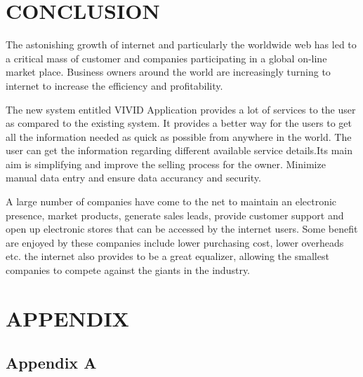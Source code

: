 \documentclass[a4paper,12pt]{article}
\begin{document}
\newpage
\section{CONCLUSION}\vspace{5mm}
  The astonishing growth of internet and particularly the worldwide web has led to a critical mass of customer and companies participating in a global on-line market place. Business owners around the world are increasingly turning to internet to increase the efficiency and profitability.
\par\vspace{2mm}
 The new system entitled VIVID Application provides a lot of services to the user as compared to the existing system. It provides a better way for the users to get all the information needed as quick as possible from anywhere in the world. The user can get the information regarding different available service details.Its main  aim is simplifying and improve the selling process for the owner. Minimize manual data entry and ensure data accurancy and security.
\par\vspace{2mm}
A large number of companies have come to the net to maintain an electronic presence, market products, generate sales leads, provide customer support and open up electronic stores that can be accessed by the internet users. Some benefit are enjoyed by these companies include lower purchasing cost, lower overheads etc. the internet also provides to be a great equalizer, allowing the smallest companies to compete against the giants in the industry.
\newpage
\section{APPENDIX}
\subsection{Appendix A}\vspace{5mm}
\end{document}
